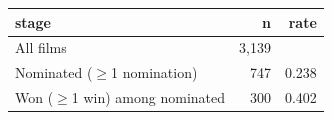 \begin{tabular}{lrr}
\toprule
stage & n & rate \\
\midrule
All films & 3,139 &  \\
Nominated ($\geq$1 nomination) & 747 & 0.238 \\
Won ($\geq$1 win) among nominated & 300 & 0.402 \\
\bottomrule
\end{tabular}